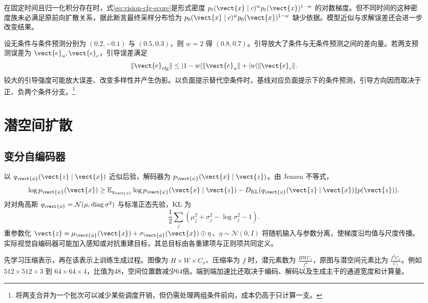 \documentclass[../textbook.tex]{subfiles}
\begin{document}
在固定时间且归一化积分存在时，式\eqref{eq:vision-cfg-score}是形式密度 $p_t(\vect{x}\mid c)^w p_t(\vect{x})^{1-w}$ 的对数梯度。但不同时间的这种密度族未必满足原前向扩散关系，据此断言最终采样分布恰为 $p_0(\vect{x}\mid c)^w p_0(\vect{x})^{1-w}$ 缺少依据。模型近似与求解误差还会进一步改变结果。

设无条件与条件预测分别为 $(0.2,-0.1)$ 与 $(0.5,0.3)$，则 $w=2$ 得 $(0.8,0.7)$。引导放大了条件与无条件预测之间的差向量。若两支预测误差为 $\vect{e}_u,\vect{e}_c$，引导误差满足
\begin{equation}
 \|\vect{e}_{\rm cfg}\|\le |1-w|\|\vect{e}_u\|+|w|\|\vect{e}_c\|.
\end{equation}
较大的引导强度可能放大误差、改变多样性并产生伪影。以负面提示替代空条件时，基线对应负面提示下的条件预测，引导方向因而取决于正、负两个条件分支。\footnote{将两支合并为一个批次可以减少某些调度开销，但仍需处理两组条件前向，成本仍高于只计算一支。}

\section{潜空间扩散}

\subsection{变分自编码器}
以 $q_{\vect{\phi}}(\vect{z}\mid \vect{x})$ 近似后验，解码器为 $p_{\vect{\psi}}(\vect{x}\mid \vect{z})$。由 Jensen 不等式，
\begin{equation}
 \log p_{\vect{\psi}}(\vect{x})\ge
 \mathbb E_{q_{\vect{\phi}}}\log p_{\vect{\psi}}(\vect{x}\mid \vect{z})
 -D_{\rm KL}(q_{\vect{\phi}}(\vect{z}\mid \vect{x})\|p(\vect{z})).
\end{equation}
对对角高斯 $q_{\vect{\phi}}=\mathcal N(\mu,\operatorname{diag}\sigma^2)$ 与标准正态先验，KL 为
\begin{equation}
 \frac12\sum_j(\mu_j^2+\sigma_j^2-\log\sigma_j^2-1).
\end{equation}
重参数化 $\vect{z}=\mu_{\vect{\phi}}(\vect{x})+\sigma_{\vect{\phi}}(\vect{x})\odot\eta$、$\eta\sim\mathcal N(0,I)$ 将随机输入与参数分离，使梯度沿均值与尺度传播。实际视觉自编码器可能加入感知或对抗重建目标，其总目标由各重建项与正则项共同定义。

先学习压缩表示，再在该表示上训练生成过程\cite{rombach2022ldm}。图像为 $H\times W\times C_x$、压缩率为 $f$ 时，潜元素数为 $\frac{HWC_z}{f^2}$，原图与潜空间元素比为 $\frac{f^2C_x}{C_z}$。例如 $512\times512\times3$ 到 $64\times64\times4$，比值为48，空间位置数减少64倍。端到端加速比还取决于编码、解码以及生成主干的通道宽度和计算量。
\end{document}
